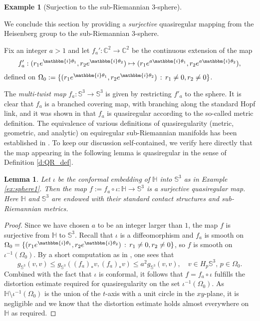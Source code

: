 \documentclass[10pt,letterpaper]{amsart}
\newtheorem{lemma}[thm]{Lemma}
\theoremstyle{definition}
\newtheorem{example}[thm]{Example}
\numberwithin{thm}{subsection}
\numberwithin{equation}{section}
\begin{document}
\begin{example}[Surjection to the sub-Riemannian $3$-sphere]
\label{ex:sphere2}

We conclude this section by providing a \emph{surjective} quasiregular mapping from the Heisenberg group to the sub-Riemannian 3-sphere.

Fix an integer $a>1$ and let $f_a': {\mathbb C}^2 \rightarrow {\mathbb C}^2$ be the continuous extension of the map
$$
f'_a:(r_1 e^{{\mathbbm{i}} \theta_1}, r_2 e^{{\mathbbm{i}} \theta_2}) \mapsto (r_1 e^{a {\mathbbm{i}} \theta_1}, r_2 e^{a{\mathbbm{i}} \theta_2}),
$$
defined on $\Omega_0 := \{(r_1 e^{{\mathbbm{i}} \theta_1}, r_2 e^{{\mathbbm{i}}
\theta_2})\,:\,r_1 \ne 0,r_2\ne 0\}$.

The \emph{multi-twist map} $f_a: {\mathbb S}^3 \rightarrow {\mathbb S}^3$ is given
by restricting $f'_a$ to the sphere. It is clear that $f_a$ is a
branched covering map, with branching along the standard
Hopf link, and it was shown in \cite{FLP} that $f_a$ is
quasiregular according to the so-called metric definition. The
equivalence of various definitions of quasiregularity (metric,
geometric, and analytic) on equiregular sub-Riemannian manifolds
has been established in \cite{GNW,GL}. To keep our discussion
self-contained, we verify here directly that the map appearing in
the following lemma is quasiregular in the sense of Definition
\ref{d:QR_def}.

\begin{lemma}\label{claim:sphereSurjection} Let $\iota$ be the conformal embedding of ${\mathbb H}$ into ${\mathbb S}^3$ as in Example \ref{ex:sphere1}.
Then the map $f:=f_a \circ \iota: {\mathbb H} \to {\mathbb S}^3$ is a surjective
quasiregular map. Here ${\mathbb H}$ and ${\mathbb S}^3$ are endowed with their
standard contact structures and sub-Riemannian metrics.
\end{lemma}

\begin{proof}
Since we have chosen $a$ to be an integer larger than $1$, the map
$f$ is surjective from ${\mathbb H}$ to ${\mathbb S}^3$. Recall that $\iota$ is
a diffeomorphism and $f_a$ is smooth on $\Omega_0 =\{(r_1 e^{{\mathbbm{i}}
\theta_1}, r_2 e^{{\mathbbm{i}} \theta_2})\,:\,r_1 \ne 0,r_2\ne 0\}$, so $f$
is smooth on $\iota^{-1}(\Omega_0)$. By a short computation as in
\cite[Section 3.2]{FLP}, one sees that
\begin{displaymath}
g_{{\mathbb S}^3}(v,v) \leq g_{{\mathbb S}^3}((f_a)_{\ast} v, (f_a)_{\ast} v) \leq
a^2 g_{{\mathbb S}^3}(v,v),\quad v\in H_p {\mathbb S}^3, \, p\in \Omega_0.
\end{displaymath}
Combined with the fact that $\iota$ is conformal, it follows that
$f= f_a \circ \iota$ fulfills the distortion estimate required for
quasiregularity on the set $\iota^{-1}(\Omega_0)$. As
${\mathbb H}\setminus \iota^{-1}(\Omega_0)$ is the union of the $t$-axis
with a unit circle in the $xy$-plane, it is negligible and we know
that the distortion estimate holds almost everywhere on ${\mathbb H}$ as
required.


\end{proof}
\end{example}
\end{document}
